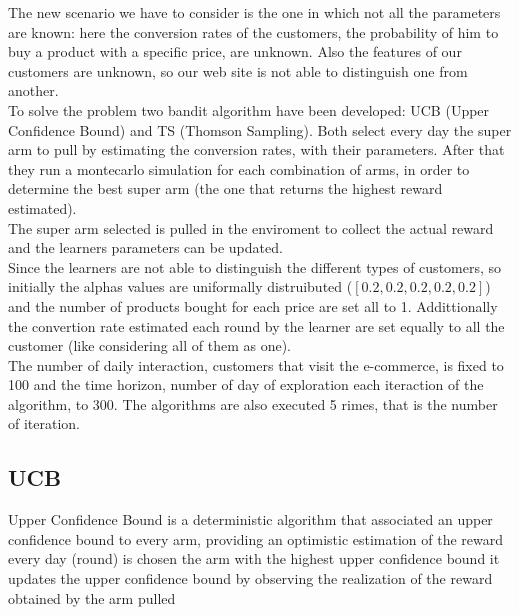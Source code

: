The new scenario we have to consider is the one in which not all the parameters are known: here the conversion rates of the customers, the probability of him to buy a product with a specific price, are unknown. Also the features of our customers are unknown, so our web site is not able to distinguish one from another. \\
To solve the problem two bandit algorithm have been developed: UCB (Upper Confidence Bound) and TS (Thomson Sampling). 
Both select every day the super arm to pull by estimating the conversion rates, with their parameters. After that they run a montecarlo simulation for each combination of arms, in order to determine the best super arm (the one that returns the highest reward estimated).\\
The super arm selected is pulled in the enviroment to collect the actual reward and the learners parameters can be updated.\\
Since the learners are not able to distinguish the different types of customers, so initially the alphas values are uniformally distruibuted ($[0.2, 0.2, 0.2, 0.2, 0.2]$) and the number of products bought for each price are set all to 1. Addittionally the convertion rate estimated each round by the learner are set equally to all the customer (like considering all of them as one).\\
The number of daily interaction, customers that visit the e-commerce, is fixed to 100 and the time horizon, number of day of exploration each iteraction of the algorithm, to 300. The algorithms are also executed 5 rimes, that is the number of iteration.

\subsection{UCB}
Upper Confidence Bound is a deterministic algorithm that associated an upper confidence bound to every arm, providing an optimistic estimation of the reward
    every day (round) is chosen the arm with the highest upper confidence bound
    it updates the upper confidence bound by observing the realization of the reward obtained by the arm pulled


